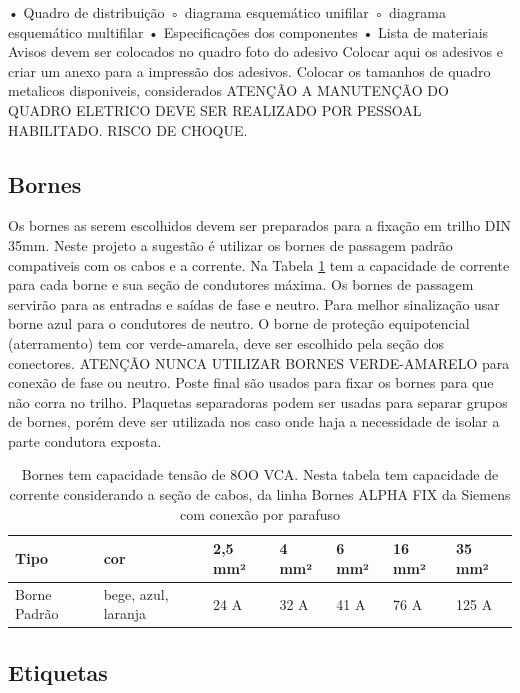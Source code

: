     • Quadro de distribuição
        ◦ diagrama esquemático unifilar
        ◦ diagrama esquemático multifilar
    • Especificações dos componentes
    • Lista de materiais
Avisos devem ser colocados no quadro
foto do adesivo
Colocar aqui os adesivos e criar um anexo para a impressão dos adesivos.
Colocar os tamanhos de quadro metalicos disponiveis, considerados
ATENÇÃO A MANUTENÇÃO DO QUADRO ELETRICO DEVE SER REALIZADO POR PESSOAL HABILITADO. RISCO DE CHOQUE.

\subsection{Bornes}
 
Os bornes as serem escolhidos devem ser preparados para a fixação em trilho DIN 35mm. Neste projeto a sugestão é utilizar os bornes de passagem padrão compativeis com os cabos e a corrente. Na Tabela \ref{tab:bornes} tem a capacidade de corrente para cada borne e sua seção de condutores máxima. 
Os bornes de passagem servirão para as entradas e saídas de fase e neutro. Para melhor sinalização usar borne azul para o condutores de neutro.
O borne de proteção equipotencial (aterramento) tem cor verde-amarela, deve ser escolhido pela seção dos conectores. ATENÇÃO NUNCA UTILIZAR BORNES VERDE-AMARELO para conexão de fase ou neutro.
Poste final são usados para fixar os bornes para que não corra no trilho.
Plaquetas separadoras podem ser usadas para separar grupos de bornes, porém deve ser utilizada nos caso onde haja a necessidade de isolar a parte condutora exposta.

\begin{table}[htbp]
\caption{Bornes tem capacidade tensão de 8OO VCA. Nesta tabela tem capacidade de corrente considerando a seção de cabos, da linha Bornes ALPHA FIX da Siemens com conexão por parafuso}
\begin{tabular}{|l|l|l|l|l|l|l|}
\hline
Tipo & cor & 2,5 mm² & 4 mm² & 6 mm² & 16 mm² & 35 mm² \\ \hline
Borne Padrão & bege, azul, laranja & 24 A & 32 A & 41 A & 76 A & 125 A \\ \hline
\end{tabular}
\label{tab:bornes}
\end{table}


\subsection{Etiquetas}


